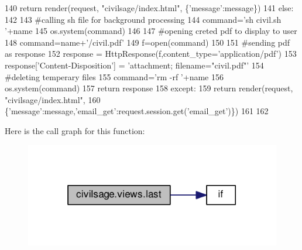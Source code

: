 \begin{DoxyCode}
140             \textcolor{keywordflow}{return} render(request, \textcolor{stringliteral}{"civilsage/index.html"}, \{\textcolor{stringliteral}{'message'}:message\})
141         \textcolor{keywordflow}{else}:
142 
143             \textcolor{comment}{#calling sh file for background processing}
144             command=\textcolor{stringliteral}{'sh  civil.sh '}+name
145             os.system(command)
146 
147             \textcolor{comment}{#opening creted pdf to display to user}
148             command=name+\textcolor{stringliteral}{'/civil.pdf'}
149             f=open(command)
150 
151             \textcolor{comment}{#sending pdf as response}
152             response = HttpResponse(f,content\_type=\textcolor{stringliteral}{'application/pdf'})
153             response[\textcolor{stringliteral}{'Content-Disposition'}] = \textcolor{stringliteral}{'attachment; filename="civil.pdf"'}
154             \textcolor{comment}{#deleting temperary files}
155             command=\textcolor{stringliteral}{'rm -rf '}+name
156             os.system(command)
157             \textcolor{keywordflow}{return} response
158     \textcolor{keywordflow}{except}:
159         \textcolor{keywordflow}{return} render(request, \textcolor{stringliteral}{"civilsage/index.html"},
160         \{\textcolor{stringliteral}{'message'}:message,\textcolor{stringliteral}{'email\_get'}:request.session.get(\textcolor{stringliteral}{'email\_get'})\})
161 
162 
\end{DoxyCode}


Here is the call graph for this function\+:
\nopagebreak
\begin{figure}[H]
\begin{center}
\leavevmode
\includegraphics[width=322pt]{namespacecivilsage_1_1views_aed47fb0740a2fa14693f697905788719_cgraph}
\end{center}
\end{figure}


\hypertarget{namespacecivilsage_1_1views_a8b58c93a9c82e84143c43dafaa744a4b}{}
